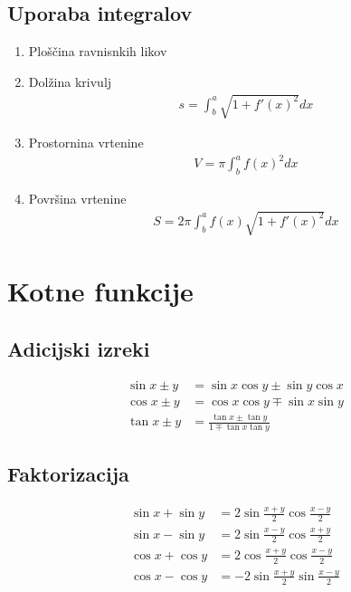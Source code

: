 \documentclass[a4paper,oneside,10pt]{article}
\theoremstyle{definition}
\begin{document}
\begin{multicols}{2}
	\subsection*{Uporaba integralov}
	\begin{enumerate}
		\item Ploščina ravnisnkih likov
		\item Dolžina krivulj
		\begin{align*}
			s = \int_{b}^{a} \sqrt{1 + f'(x)^2} dx
		\end{align*}
		\item Prostornina vrtenine
		\begin{align*}
			V = \pi \int_{b}^{a} f(x)^2 dx
		\end{align*}
		\item Površina vrtenine
		\begin{align*}
			S = 2\pi \int_{b}^{a} f(x)\sqrt{1+f'(x)^2} dx
		\end{align*}
	\end{enumerate}
%
	\section*{Kotne funkcije}
	\subsection*{Adicijski izreki}
	\begin{align*}
		\sin{x \pm y} &= \sin{x}\cos{y} \pm \sin{y}\cos{x}\\
		\cos{x \pm y} &= \cos{x}\cos{y} \mp \sin{x}\sin{y}\\
		\tan{x \pm y} &= \frac{\tan{x} \pm \tan{y}}{1 \mp \tan{x}\tan{y}}
	\end{align*}
	\subsection*{Faktorizacija}
	\begin{align*}
		\sin{x} + \sin{y} &= 2\sin{\frac{x+y}{2}} \cos{\frac{x-y}{2}}\\
		\sin{x} - \sin{y} &= 2\sin{\frac{x-y}{2}} \cos{\frac{x+y}{2}}\\
		\cos{x} + \cos{y} &= 2\cos{\frac{x+y}{2}} \cos{\frac{x-y}{2}}\\
		\cos{x} - \cos{y} &= -2\sin{\frac{x+y}{2}} \sin{\frac{x-y}{2}}
	\end{align*}

\end{multicols}
\end{document}
